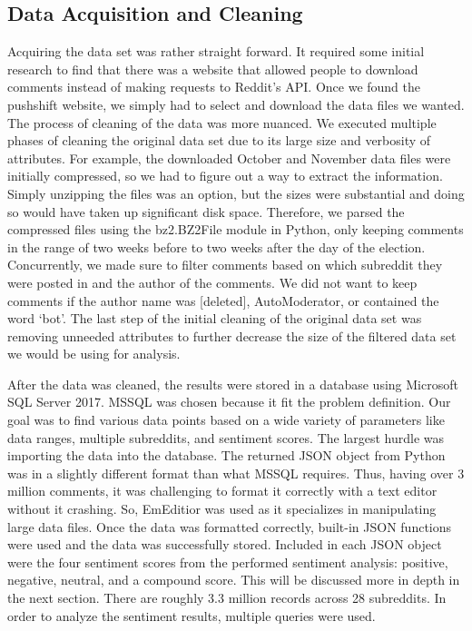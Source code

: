 \documentclass[letterpaper]{article}
\begin{document}
\subsection{Data Acquisition and Cleaning}

Acquiring the data set was rather straight forward. It required some initial research to find that there was a website that allowed people to download comments instead of making requests to Reddit's API. Once we found the pushshift website, we simply had to select and download the data files we wanted.
The process of cleaning of the data was more nuanced. We executed multiple phases of cleaning the original data set due to its large size and verbosity of attributes. For example, the downloaded October and November data files were initially compressed, so we had to figure out a way to extract the information. Simply unzipping the files was an option, but the sizes were substantial and doing so would have taken up significant disk space. Therefore, we parsed the compressed files using the bz2.BZ2File module in Python, only keeping comments in the range of two weeks before to two weeks after the day of the election. Concurrently, we made sure to filter comments based on which subreddit they were posted in and the author of the comments. We did not want to keep comments if the author name was [deleted], AutoModerator, or contained the word `bot'. The last step of the initial cleaning of the original data set was removing unneeded attributes to further decrease the size of the filtered data set we would be using for analysis.

After the data was cleaned, the results were stored in a database using Microsoft SQL Server 2017. MSSQL was chosen because it fit the problem definition. Our goal was to find various data points based on a wide variety of parameters like data ranges, multiple subreddits, and sentiment scores. The largest hurdle was importing the data into the database. The returned JSON object from Python was in a slightly different format than what MSSQL requires. Thus, having over 3 million comments, it was challenging to format it correctly with a text editor without it crashing. So, EmEditior was used as it specializes in manipulating large data files. Once the data was formatted correctly, built-in JSON functions were used and the data was successfully stored. Included in each JSON object were the four sentiment scores from the performed sentiment analysis: positive, negative, neutral, and a compound score. This will be discussed more in depth in the next section. There are roughly 3.3 million records across 28 subreddits. In order to analyze the sentiment results, multiple queries were used.
\end{document}
